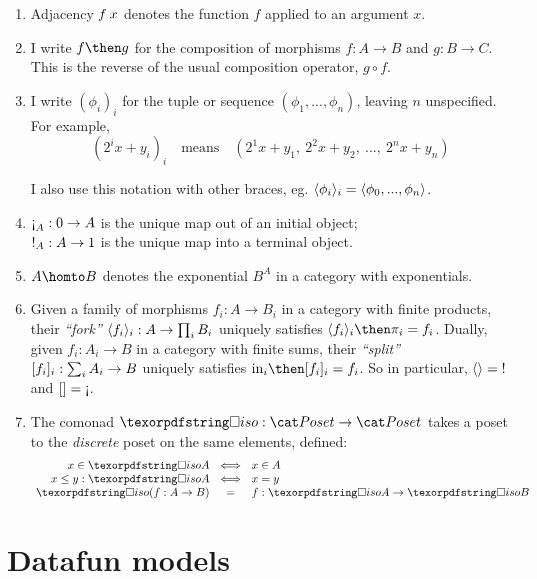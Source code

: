 \documentclass{rntz}\usepackage{fantasy}\geometry{textwidth=330pt,}
\begin{document}
\begin{enumerate}
\item Adjacency $f\<x$ denotes the function $f$ applied to an argument $x$.

\item I write $f \then g$ for the composition of morphisms $f : A \to B$ and $g
  : B \to C$. This is the reverse of the usual composition operator, $g \circ
  f$.

  \newcommand\iexpr{\phi}
\item I write $(\iexpr_i)_i$ for the tuple or sequence $(\iexpr_1,
  ..., \iexpr_n)$, leaving $n$ unspecified. For example,
  \[ (2^ix + y_i)_i \quad\text{means}\quad
  (2^1x + y_1,~ 2^2x + y_2,~ ...,~ 2^nx + y_n) \]

  \noindent
  I also use this notation with other braces, eg. $\fork{\iexpr_i}_i =
  \fork{\iexpr_0, ..., \iexpr_n}$.

\item $\initE_A : \initO \to A$ is the unique map out of an initial object;\\
  $\mathord{!}_A : A \to 1$ is the unique map into a terminal object.

\item $A \homto B$ denotes the exponential $B^A$ in a category with
  exponentials.

\item Given a family of morphisms $f_i : A \to B_i$ in a category with finite
  products, their \emph{``fork''} $\langle{f_i}\rangle_i : A \to \textstyle\prod_{i} B_i$
  uniquely satisfies $\fork{f_i}_i \then \pi_i = f_i$. Dually, given $f_i : A_i
  \to B$ in a category with finite sums, their \emph{``split''} $[{f_i}]_i :
  \sum_i A_i \to B$ uniquely satisfies $\injc_i \then \krof{f_i}_i = f_i$. So in
  particular, $\langle{}\rangle = \mathord{!}$ and $\krof{} = \initE$.

\item The comonad $\iso : \Poset \to \Poset$ takes a poset to the
  \emph{discrete} poset on the same elements, defined:
  \[\setlength\arraycolsep{.33em}
  \begin{array}{rcl}
    x \in \isof A &\iff& x \in A\\
    x \le y : \isof A &\iff& x = y\\
    \isof(f : A \to B) &=& f : \isof A \to \isof B
  \end{array}\]
\end{enumerate}


\section{Datafun models}
\label{sec:datafun-models}
\end{document}
